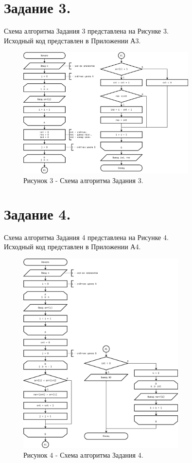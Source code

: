 \documentclass[oneside,a4paper,14pt]{extarticle}
\begin{document}
\section*{Задание 3.}
\noindent Схема алгоритма Задания 3 представлена на Рисунке 3.\\
\noindent Исходный код представлен в Приложении А3. \\

\begin{figure}[!ht]
	\centering
	\includegraphics[width=0.8\textwidth]{pics/flowchart-15.png}
	\caption*{Рисунок 3 - Схема алгоритма Задания 3.}
\end{figure}

\section*{Задание 4.}
\noindent Схема алгоритма Задания 4 представлена на Рисунке 4.\\
\noindent Исходный код представлен в Приложении А4. \\
\newpage
\begin{figure}[!ht]
	\centering
	\includegraphics[width=0.75\textwidth]{pics/flowchart-16.png}
	\caption*{Рисунок 4 - Схема алгоритма Задания 4.}
\end{figure}
\end{document}
